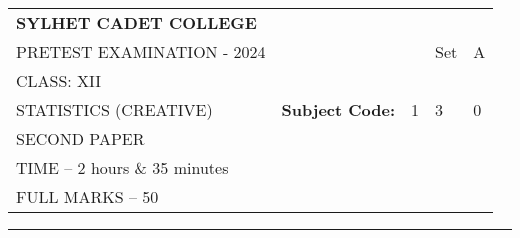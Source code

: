 \documentclass{article}
\begin{document}
\begin{table}[h]
\centering
\begin{tabular}{lllll}
\textbf{\large SYLHET CADET COLLEGE} &  &  &  &  \\ \cline{4-5} 
PRETEST EXAMINATION - 2024 &  & \multicolumn{1}{l|}{} & \multicolumn{1}{l|}{Set} & \multicolumn{1}{l|}{A} \\ \cline{4-5} 
CLASS: XII &  &  &  &  \\ \cline{3-5} 
STATISTICS (CREATIVE)& \multicolumn{1}{l|}{\textbf{Subject Code:}} & \multicolumn{1}{l|}{1} & \multicolumn{1}{l|}{3} & \multicolumn{1}{l|}{0} \\ \cline{3-5} 
 SECOND PAPER &  &  &  &  \\
TIME – 2 hours \& 35 minutes &  &  &  &  \\
FULL MARKS – 50 &  &  &  & 
\end{tabular}
\end{table}

\hrule
\end{document}
